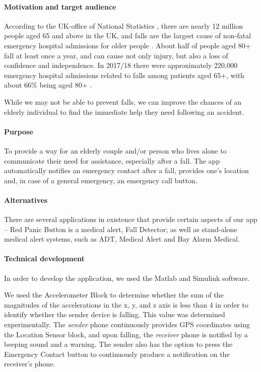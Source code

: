 \documentclass[12pt,a4paper]{article}
\begin{document}
\paragraph{Motivation and target audience}
    According to the UK-office of National Statistics \citep{ONSstats}, there are nearly 12 million people aged 65 and above in the UK, and falls are the largest cause of non-fatal emergency hospital admissions for older people \citep{NHSInjuries}.
    About half of people aged 80+ fall at least once a year, and can cause not only injury, but also a loss of confidence and independence.
    In 2017/18 there were approximately 220,000 emergency hospital admissions related to falls among patients aged 65+, with about 66\% being aged 80+ \citep{GovUKFalls}.

    While we may not be able to prevent falls, we can improve the chances of an elderly individual to find the immediate help they need following an accident.

\paragraph{Purpose}
    To provide a way for an elderly couple and/or person who lives alone to communicate their need for assistance, especially after a fall.
    The app automatically notifies an emergency contact after a fall, provides one's location and, in case of a general emergency, an emergency call button. 

\paragraph{Alternatives}
    There are several applications in existence that provide certain aspects of our app -- Red Panic Button is a medical alert, Fall Detector; as well as stand-alone medical alert systems, such as ADT, Medical Alert and Bay Alarm Medical.

\paragraph{Technical development}
    In order to develop the application, we used the Matlab and Simulink software.

    We used the Accelerometer Block to determine whether the sum of the magnitudes of the accelerations in the x, y, and z axis is less than 4 in order to identify whether the sender device is falling.
    This value was determined experimentally. 
    The \textit{sender} phone continuously provides GPS coordinates using the Location Sensor block, and upon falling, the \textit{receiver} phone is notified by a beeping sound and a warning.
    The sender also has the option to press the Emergency Contact button to continuously produce a notification on the receiver’s phone. 
\end{document}
